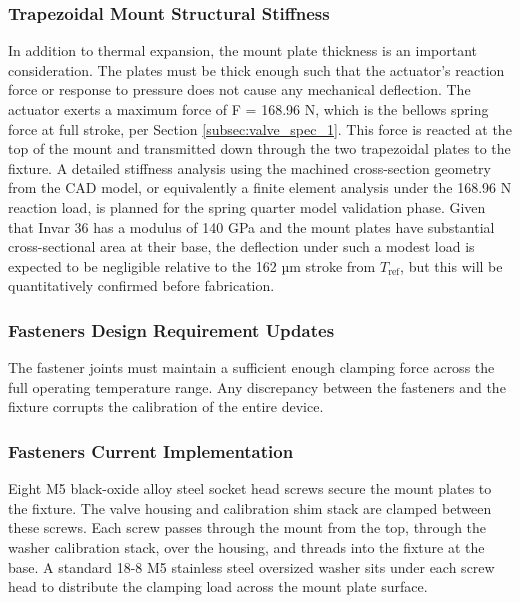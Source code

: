 \documentclass[12pt, letterpaper]{report}%
\newcounter{mycounter}           %
\newcounter{sub}[mycounter]      %
\begin{document}
        \subsubsection{Trapezoidal Mount Structural Stiffness}
        In addition to thermal expansion, the mount plate thickness is an important consideration. The plates must be thick enough such that the actuator's reaction force or response to pressure does not cause any mechanical deflection. The actuator exerts a maximum force
         of F = 168.96 N, which is the bellows spring force at full stroke, per Section \ref{subsec:valve_spec_1}. This force is reacted at the top of the mount and transmitted down through the two trapezoidal plates to the fixture. A detailed stiffness analysis using the machined cross-section geometry from the CAD model, or equivalently a finite element analysis under the 168.96 N reaction load, is planned for the spring quarter model validation phase. 
         Given that Invar 36 has a modulus of 140 GPa and the mount plates have substantial cross-sectional area at their base, the deflection under such a modest load is expected to be negligible relative to the 162 µm stroke from $T_{\text{ref}}$, but this will be quantitatively confirmed before fabrication.
        
        \subsubsection{Fasteners Design Requirement Updates}
        The fastener joints must maintain a sufficient enough clamping force across the full operating temperature range. Any discrepancy between the fasteners and the fixture corrupts the calibration of the entire device.

        \subsubsection{Fasteners Current Implementation}
        Eight M5 black-oxide alloy steel socket head screws secure the mount plates to the fixture. The valve housing and calibration shim stack are clamped between these screws. Each screw passes through the mount from the top, through the washer calibration stack, over the housing, and threads into the fixture at the base.
        A standard 18-8 M5 stainless steel oversized washer sits under each screw head to distribute the clamping load across the mount plate surface. 
        
\end{document}
